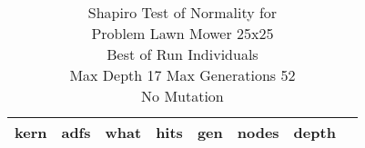 \begin{table}[H]
\caption{Shapiro Test of Normality for \\ Problem  Lawn Mower 25x25\\Best of Run Individuals \\ Max Depth 17 Max Generations 52\\ No Mutation \\}
\begin{center}
\scalebox{0.8} %
{
\begin{tabular}{lrrrrrrr}
\hline
kern & adfs & what & hits & gen & nodes & depth \\
\hline


\end{tabular}
}
\end{center}
\end{table}

